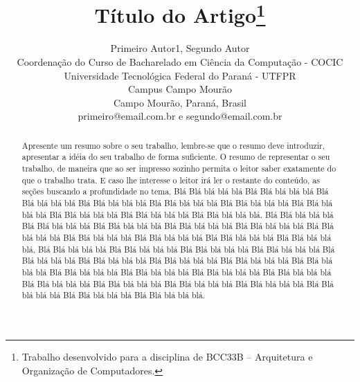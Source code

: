 \documentclass[times, 10pt,twocolumn]{article}
\begin{document}
\begin{savenotes}
\title{Título do Artigo\footnote{Trabalho desenvolvido para a disciplina de BCC33B – Arquitetura e Organização de Computadores.}}


\author{Primeiro Autor1, Segundo Autor\\
Coordenação do Curso de Bacharelado em Ciência da Computação - COCIC\\
Universidade Tecnológica Federal do Paraná - UTFPR\\ 
Campus Campo Mourão\\
Campo Mourão, Paraná, Brasil\\
primeiro@email.com.br e segundo@email.com.br\\
}

\maketitle
\thispagestyle{empty}

\begin{abstract}
   Apresente um resumo sobre o seu trabalho, lembre-se que o resumo deve introduzir, apresentar a idéia do seu trabalho de forma suficiente. O resumo de representar o seu trabalho, de maneira que ao ser impresso sozinho permita o leitor saber exatamente do que o trabalho trata. E caso lhe interesse o leitor irá ler o restante do conteúdo, as seções buscando a profundidade no tema.
   Blá Blá blá blá blá Blá Blá blá blá blá Blá Blá blá blá blá Blá Blá blá blá blá Blá Blá blá blá blá Blá Blá blá blá blá Blá Blá blá blá blá Blá Blá blá blá blá Blá Blá blá blá blá Blá Blá blá blá blá. Blá Blá blá blá blá Blá Blá blá blá blá Blá Blá blá blá blá Blá Blá blá blá blá Blá Blá blá blá blá Blá Blá blá blá blá Blá Blá blá blá blá Blá Blá blá blá blá Blá Blá blá blá blá Blá Blá blá blá blá, Blá Blá blá blá blá Blá Blá blá blá blá Blá Blá blá blá blá Blá Blá blá blá blá Blá Blá blá blá blá Blá Blá blá blá blá Blá Blá blá blá blá Blá Blá blá blá blá Blá Blá blá blá blá Blá Blá blá blá blá Blá Blá blá blá blá Blá Blá blá blá blá Blá Blá blá blá blá Blá Blá blá blá blá Blá Blá blá blá blá Blá Blá blá blá blá Blá Blá blá blá blá Blá Blá blá blá blá Blá Blá blá blá blá Blá Blá blá blá blá.
\end{abstract}

\end{savenotes}
\end{document}
